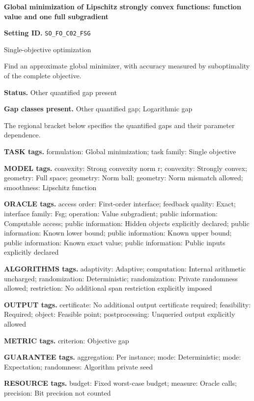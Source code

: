 \documentclass[10pt,a4paper]{article}
\begin{document}
\raggedright

{\LARGE\bfseries\sffamily\color{AtlasNavy} Global minimization of Lipschitz strongly convex functions: function value and one full subgradient\par}\vspace{5pt}
\textbf{Setting ID.} \texttt{SO\_\allowbreak{}FO\_\allowbreak{}C02\_\allowbreak{}FSG}

Single-objective optimization

Find an approximate global minimizer, with accuracy measured by suboptimality of the complete objective.

\textbf{Status.} Other quantified gap present

\textbf{Gap classes present.} Other quantified gap; Logarithmic gap

The regional bracket below specifies the quantified gaps and their parameter dependence.

\textbf{TASK tags.} formulation: Global minimization; task family: Single objective

\textbf{MODEL tags.} convexity: Strong convexity norm r; convexity: Strongly convex; geometry: Full space; geometry: Norm ball; geometry: Norm mismatch allowed; smoothness: Lipschitz function

\textbf{ORACLE tags.} access order: First-order interface; feedback quality: Exact; interface family: Fsg; operation: Value subgradient; public information: Computable access; public information: Hidden objects explicitly declared; public information: Known lower bound; public information: Known upper bound; public information: Known exact value; public information: Public inputs explicitly declared

\textbf{ALGORITHMS tags.} adaptivity: Adaptive; computation: Internal arithmetic uncharged; randomization: Deterministic; randomization: Private randomness allowed; restriction: No additional span restriction explicitly imposed

\textbf{OUTPUT tags.} certificate: No additional output certificate required; feasibility: Required; object: Feasible point; postprocessing: Unqueried output explicitly allowed

\textbf{METRIC tags.} criterion: Objective gap

\textbf{GUARANTEE tags.} aggregation: Per instance; mode: Deterministic; mode: Expectation; randomness: Algorithm private seed

\textbf{RESOURCE tags.} budget: Fixed worst-case budget; measure: Oracle calls; precision: Bit precision not counted
\end{document}
